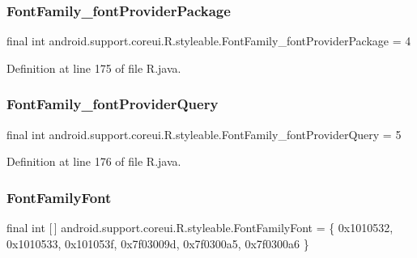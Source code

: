 \subsubsection{\texorpdfstring{FontFamily\_fontProviderPackage}{FontFamily\_fontProviderPackage}}
{\footnotesize\ttfamily final int android.\+support.\+coreui.\+R.\+styleable.\+Font\+Family\+\_\+font\+Provider\+Package = 4\hspace{0.3cm}{\ttfamily [static]}}



Definition at line 175 of file R.\+java.

\mbox{\label{classandroid_1_1support_1_1coreui_1_1_r_1_1styleable_aa014bc6506c2e66cb1ac0b33c3c8bbbc}} 
\subsubsection{\texorpdfstring{FontFamily\_fontProviderQuery}{FontFamily\_fontProviderQuery}}
{\footnotesize\ttfamily final int android.\+support.\+coreui.\+R.\+styleable.\+Font\+Family\+\_\+font\+Provider\+Query = 5\hspace{0.3cm}{\ttfamily [static]}}



Definition at line 176 of file R.\+java.

\mbox{\label{classandroid_1_1support_1_1coreui_1_1_r_1_1styleable_a09e7beadaea835cfa141e2895096c743}} 
\subsubsection{\texorpdfstring{FontFamilyFont}{FontFamilyFont}}
{\footnotesize\ttfamily final int \mbox{[}$\,$\mbox{]} android.\+support.\+coreui.\+R.\+styleable.\+Font\+Family\+Font = \{ 0x1010532, 0x1010533, 0x101053f, 0x7f03009d, 0x7f0300a5, 0x7f0300a6 \}\hspace{0.3cm}{\ttfamily [static]}}



